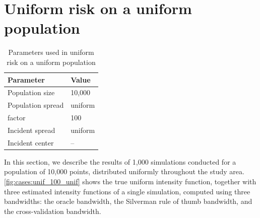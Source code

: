 \section{Uniform risk on a uniform population}
\label{sec:results:unif_100_unif}

\begin{table}[htbp]
\centering
\begin{tabular}{ll}
\hline
Parameter & Value \\
\hline
Population size & 10,000 \\
Population \gls{spread} & uniform \\
\Gls{factor} & 100 \\
Incident \gls{spread} & uniform \\
Incident center & -- \\
\hline
\end{tabular}
\caption{Parameters used in uniform risk on a uniform population}
\label{tab:params:unif_100_unif}
\end{table}

In this section, we describe the results of 1,000 simulations conducted for a population of 10,000 points,
distributed uniformly throughout the study area.
\autoref{fig:cases:unif_100_unif} shows the true uniform intensity function,
together with three estimated intensity functions of a single simulation,
computed using three bandwidths: the oracle bandwidth, the Silverman rule of thumb bandwidth,
and the cross-validation bandwidth.

